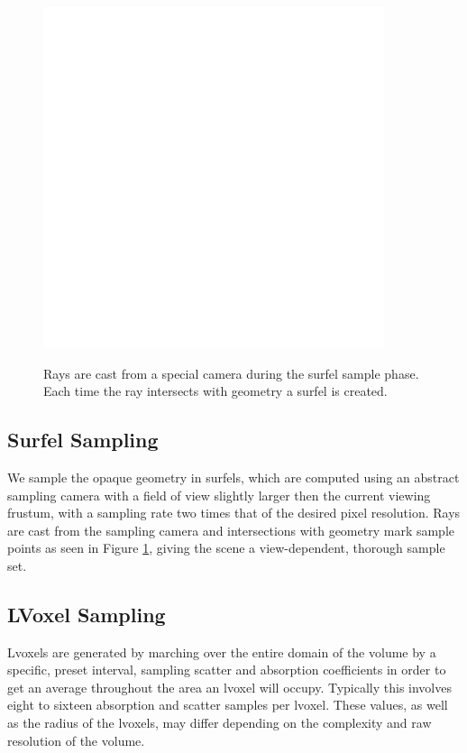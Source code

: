 \documentclass[12pt]{ucthesis}
\newcommand{\captionfonts}{\small\bf\ssp}
\begin{document}
\begin{figure}[h!]
    \centering
    \includegraphics[width=100mm]{img/diag/surfel_samp.pdf}
    \captionfonts
    \caption{Rays are cast from a special camera during the surfel sample phase.  Each time the ray intersects with geometry a surfel is created.}
    \label{fig:surf_sample}
\end{figure}

\subsection{Surfel Sampling}

We sample the opaque geometry in surfels, which are computed using an abstract sampling camera with a field of view slightly larger then the current viewing frustum, with a sampling rate two times that of the desired pixel resolution.  Rays are cast from the sampling camera and intersections with geometry mark sample points as seen in Figure \ref{fig:surf_sample}, giving the scene a view-dependent, thorough sample set.

\subsection{LVoxel Sampling}

Lvoxels are generated by marching over the entire domain of the volume by a specific, preset interval, sampling scatter and absorption coefficients in order to get an average throughout the area an lvoxel will occupy.  Typically this involves eight to sixteen absorption and scatter samples per lvoxel.  These values, as well as the radius of the lvoxels, may differ depending on the complexity and raw resolution of the volume.
\end{document}

